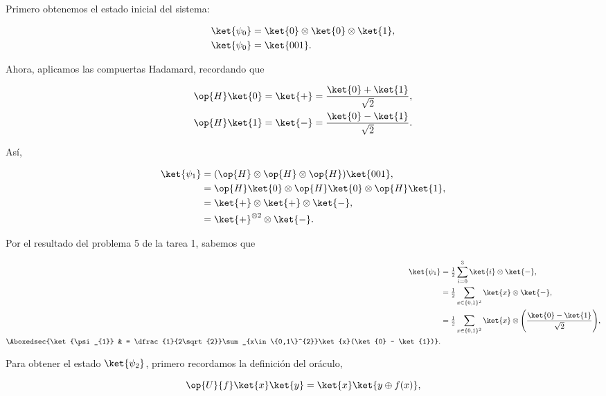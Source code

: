 \documentclass[./../main.tex]{subfiles}
\begin{document}
\startsolution

Primero obtenemos el estado inicial del sistema:

\begin{align}
	\ket{\psi_{0}} & = \tensprod{\ket{0}}{\ket{0}}[\ket{1}][nopar],\nonumber \\
	\ket{\psi_{0}} & = \ket{001}.\label{eq:psi0}
\end{align}

Ahora, aplicamos las compuertas Hadamard, recordando que

\begin{align*}
	\op{H}\ket{0} & = \ket{+} = \dfrac{\ket{0} + \ket{1}}{\sqrt{2}}, \\
	\op{H}\ket{1} & = \ket{-} = \dfrac{\ket{0} - \ket{1}}{\sqrt{2}}.
\end{align*}

Así,

\begin{align*}
	\ket{\psi_{1}} & = (\tensprod{\op{H}}{\op{H}}[\op{H}][nopar])\ket{001},           \\
	               & = \tensprod{\op{H}\ket{0}}{\op{H}\ket{0}}[\op{H}\ket{1}][nopar], \\
	               & = \tensprod{\ket{+}}{\ket{+}}[\ket{-}][nopar],                   \\
	               & = \tensprod{\ket{+}^{\otimes 2}}{\ket{-}}.
\end{align*}

Por el resultado del problema 5 de la tarea 1, sabemos que

\begin{align}
	\ket{\psi_{1}}            & = \tfrac{1}{2}\sum_{i = 0}^{3}\tensprod{\ket{i}}{\ket{-}},\nonumber                                                  \\
	                          & = \tfrac{1}{2}\sum_{x\in \{0,1\}^{2}}\tensprod{\ket{x}}{\ket{-}},\nonumber                                           \\
	                          & = \tfrac{1}{2}\sum_{x\in \{0,1\}^{2}}\tensprod{\ket{x}}{\Biggl(\dfrac{\ket{0} - \ket{1}}{\sqrt{2}}\Biggr)},\nonumber \\
	\Aboxedsec{\ket{\psi_{1}} & = \dfrac{1}{2\sqrt{2}}\sum_{x\in \{0,1\}^{2}}\ket{x}(\ket{0} - \ket{1})}.\label{eq:psi1}
\end{align}

Para obtener el estado \(\ket{\psi_{2}}\), primero recordamos la definición del oráculo,

\begin{equation*}
	\op{U}{f}\ket{x}\ket{y} = \ket{x}\ket{y \oplus f(x)},
\end{equation*}
\end{document}
